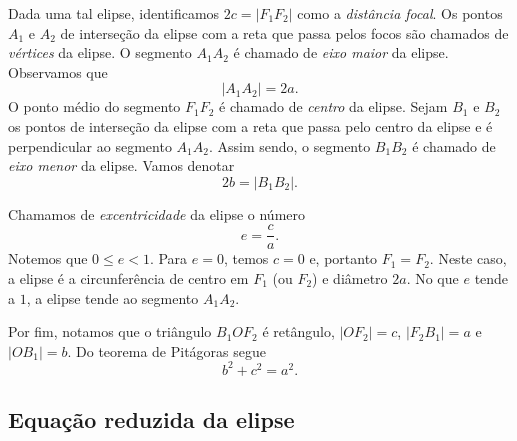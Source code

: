 Dada uma tal elipse, identificamos $2c=|F_1F_2|$ como a \emph{distância focal}. Os pontos $A_1$ e $A_2$ de interseção da elipse com a reta que passa pelos focos são chamados de \emph{vértices} da elipse. O segmento $A_1A_2$ é chamado de \emph{eixo maior} da elipse. Observamos que
\begin{equation}
  |A_1A_2| = 2a.
\end{equation}
O ponto médio do segmento $F_1F_2$ é chamado de \emph{centro} da elipse. Sejam $B_1$ e $B_2$ os pontos de interseção da elipse com a reta que passa pelo centro da elipse e é perpendicular ao segmento $A_1A_2$. Assim sendo, o segmento $B_1B_2$ é chamado de \emph{eixo menor} da elipse. Vamos denotar
\begin{equation}
  2b = |B_1B_2|.
\end{equation}

Chamamos de \emph{excentricidade} da elipse o número
\begin{equation}
  e = \frac{c}{a}.
\end{equation}
Notemos que $0 \leq e < 1$. Para $e=0$, temos $c=0$ e, portanto $F_1=F_2$. Neste caso, a elipse é a circunferência de centro em $F_1$ (ou $F_2$) e diâmetro $2a$. No que $e$ tende a $1$, a elipse tende ao segmento $A_1A_2$.

Por fim, notamos que o triângulo $B_1OF_2$ é retângulo, $|OF_2|=c$, $|F_2B_1|=a$ e $|OB_1|=b$. Do teorema de Pitágoras segue
\begin{equation}\label{eq:elipse_obs}
  b^2 + c^2 = a^2.
\end{equation}

\subsection{Equação reduzida da elipse}

